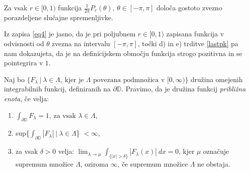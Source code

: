 \documentclass[mat1]{fmfdelo}
\begin{document}
    \begin{posledica}
        Za vsak $r \in [0, 1)$ funkcija $\frac{1}{2 \pi} P_r(\theta),~ \theta \in [-\pi, \pi]$ določa gostoto zvezno porazdeljene slučajne spremenljivke.
    \end{posledica}
    \begin{dokaz}
        Iz zapisa \eqref{eq4} je jasno, da je pri poljubnem $r \in [0,1)$ zapisana funkcija v odvisnosti od $\theta$ zvezna na intervalu $[-\pi, \pi]$, točki d) in e) trditve \ref{lastpk} pa nam dokazujeta, da je na definicijskem območju funkcija strogo pozitivna in se pointegrira v $1$.
    \end{dokaz}

    \begin{definicija}
        Naj bo $\{F_{\lambda}~|~\lambda \in \Lambda,~\text{kjer je $\Lambda$ povezana podmnožica v $[0, \infty)$}\}$ družina omejenih integrabilnih funkcij, definiranih na $\partial \mathbb{D}$. Pravimo, da je družina funkcij \emph{približna enota}, če velja:
        \begin{enumerate}[label={\Alph*)}]
            \item $\int_{\partial \mathbb{D}}{F_\lambda} = 1,~\text{za vsak $\lambda \in \Lambda$}$,
            \item sup\{$\int_{\partial \mathbb{D}}{\left| F_{\lambda}\right|}~|~\lambda \in \Lambda$\} $< \infty$,
            \item za vsak $\delta > 0$ velja: $\lim_{\lambda \to \mu}{\int_{\{|x| > \delta\}}{|F_{\lambda}(x)|~dx}} = 0$, kjer $\mu$ označuje supremum množice $\Lambda$, oziroma $\infty$, če supremum množice $\Lambda$ ne obstaja.
        \end{enumerate}
    \end{definicija}
\end{document}
